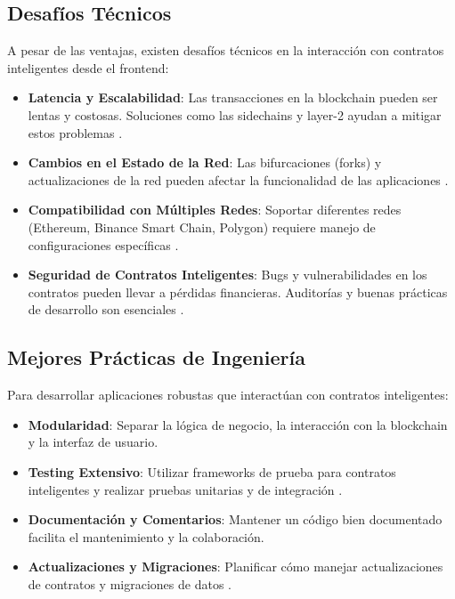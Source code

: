 \subsection{Desafíos Técnicos}

A pesar de las ventajas, existen desafíos técnicos en la interacción con contratos inteligentes desde el frontend:

\begin{itemize}
    \item \textbf{Latencia y Escalabilidad}: Las transacciones en la blockchain pueden ser lentas y costosas. Soluciones como las sidechains y layer-2 ayudan a mitigar estos problemas \cite{croman2016scaling}.

    \item \textbf{Cambios en el Estado de la Red}: Las bifurcaciones (forks) y actualizaciones de la red pueden afectar la funcionalidad de las aplicaciones \cite{gudgeon2020defi}.

    \item \textbf{Compatibilidad con Múltiples Redes}: Soportar diferentes redes (Ethereum, Binance Smart Chain, Polygon) requiere manejo de configuraciones específicas \cite{wu2021defi}.

    \item \textbf{Seguridad de Contratos Inteligentes}: Bugs y vulnerabilidades en los contratos pueden llevar a pérdidas financieras. Auditorías y buenas prácticas de desarrollo son esenciales \cite{atzei2017survey}.

\end{itemize}

\subsection{Mejores Prácticas de Ingeniería}

Para desarrollar aplicaciones robustas que interactúan con contratos inteligentes:

\begin{itemize}
    \item \textbf{Modularidad}: Separar la lógica de negocio, la interacción con la blockchain y la interfaz de usuario.

    \item \textbf{Testing Extensivo}: Utilizar frameworks de prueba para contratos inteligentes y realizar pruebas unitarias y de integración \cite{mavridou2019verisolid}.

    \item \textbf{Documentación y Comentarios}: Mantener un código bien documentado facilita el mantenimiento y la colaboración.

    \item \textbf{Actualizaciones y Migraciones}: Planificar cómo manejar actualizaciones de contratos y migraciones de datos \cite{dannen2017introducing}.

\end{itemize}

